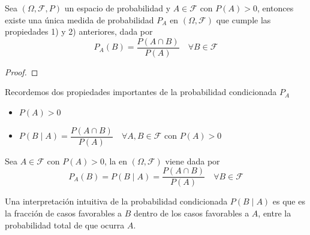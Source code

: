 \begin{prop}
    Sea $(\Omega, \mathcal{F}, P)$ un espacio de probabilidad y $A\in \mathcal{F}$ con $P(A)>0$, entonces existe una única medida de probabilidad $P_A$ en $(\Omega, \mathcal{F})$ que cumple las propiedades 1) y 2) anteriores, dada por
    \begin{equation*}
        P_A(B) = \dfrac{P(A\cap B)}{P(A)} \quad \forall B\in \mathcal{F}
    \end{equation*}
    \begin{proof}
    \end{proof}
\end{prop}

\begin{observacion}
    Recordemos dos propiedades importantes de la probabilidad condicionada $P_A$
    \begin{itemize}
        \item $P(A)> 0$
        \item $P(B \mid A) = \dfrac{P(A\cap B)}{P(A)} \quad \forall A, B \in \mathcal{F} \text{ con } P(A)>0$
    \end{itemize}
\end{observacion}

\begin{definicion}
    Sea $A\in \mathcal{F}  $ con $P(A)>0$, la  en $(\Omega, \mathcal{F})$ viene dada por
    \begin{equation*}
        P_A(B) = P(B \mid A) = \dfrac{P(A\cap B)}{P(A)} \quad \forall B\in \mathcal{F}
    \end{equation*}
\end{definicion}
\noindent
Una interpretación intuitiva de la probabilidad condicionada $P(B\mid A)$ es que es la fracción de casos favorables a $B$ dentro de los casos favorables a $A$, entre la probabilidad total de que ocurra $A$.

